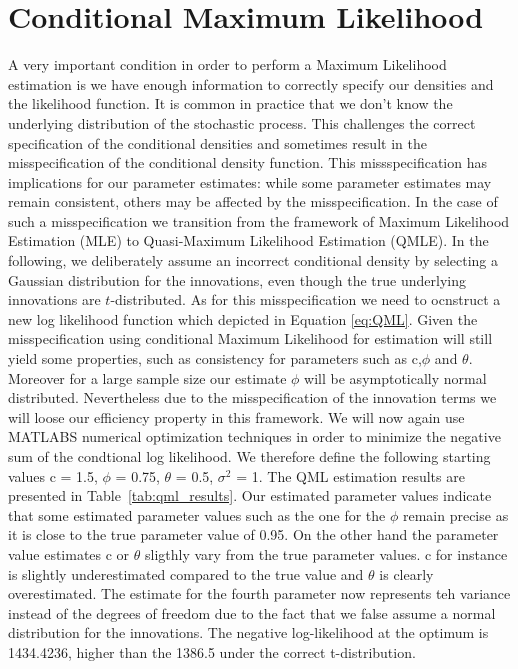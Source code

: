 \documentclass[12pt]{article}
\begin{document}
\section{Conditional Maximum Likelihood}
A very important condition in order to perform a Maximum Likelihood estimation is we have enough information to correctly specify our densities and the likelihood function.
It is common in practice that we don't know the underlying distribution of the stochastic process.
This challenges the correct specification of the conditional densities and sometimes result in the misspecification of the conditional density function.
This missspecification has implications for our parameter estimates: while some parameter estimates may remain consistent, others may be affected by the misspecification.
In the case of such a misspecification we transition from the framework of 
Maximum Likelihood Estimation (MLE) to Quasi-Maximum Likelihood Estimation (QMLE).
In the following, we deliberately assume an incorrect conditional density by selecting a Gaussian distribution for the innovations, even though the true underlying innovations are \( t \)-distributed.
As for this misspecification we need to ocnstruct a new log likelihood function which depicted in Equation \ref{eq:QML}.
Given the misspecification using conditional Maximum Likelihood for estimation will still yield some properties, such as consistency for parameters such as c,$\phi$ and $\theta$. Moreover for a large sample size our estimate $\phi$ will be asymptotically normal distributed.
Nevertheless due to the misspecification of the innovation terms we will loose our efficiency property in this framework.
We will now again use MATLABS numerical optimization techniques in order to minimize the negative sum of the condtional log likelihood.
We therefore define the following starting values c = 1.5, $\phi$ = 0.75, $\theta$ = 0.5, $\sigma^2$ = 1.
The QML estimation results are presented in Table~\ref{tab:qml_results}.
Our estimated parameter values indicate that some estimated parameter values such as the one for the  $\phi$ remain precise as it is close to the true parameter value of 0.95. On the other hand the parameter value estimates c or $\theta$ sligthly vary from the true parameter values.
c for instance is slightly underestimated compared to the true value and $\theta$ is clearly overestimated.
The estimate for the fourth parameter now represents teh variance instead of the degrees of freedom due to the fact that we false assume a normal distribution for the innovations.
The negative log-likelihood at the optimum is 1434.4236, higher than the 1386.5 under the correct t-distribution.
\end{document}
